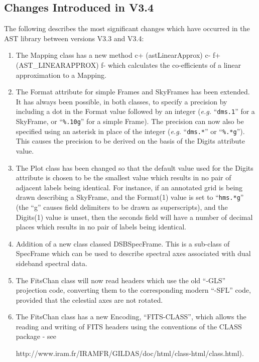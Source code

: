 \documentclass[twoside,11pt]{article}
\newcommand{\htmladdnormallink}[2]{#1}
\begin{document}
\subsection{Changes Introduced in V3.4}

The following describes the most significant changes which have
occurred in the AST library between versions V3.3 and V3.4:

\begin{enumerate}

\item The Mapping class has a new method 
c+
(astLinearApprox)
c-
f+
(AST\_LINEARAPPROX)
f-
which calculates the co-efficients of a linear approximation to a Mapping.

\item The Format attribute for simple Frames and SkyFrames has been extended.
It has always been possible, in both classes, to specify a precision by
including a dot in the Format value followed by an integer (\emph{e.g.}
``\verb+dms.1+'' for a SkyFrame, or ``\verb+%.10g+'' for a simple Frame).
The precision can now also be specified using an asterisk in place of the
integer (\emph{e.g.} ``\verb+dms.*+'' or ``\verb+%.*g+''). This causes the
precision to be derived on the basis of the Digits attribute value.

\item The Plot class has been changed so that the default value used for the
Digits attribute is chosen to be the smallest value which results in no
pair of adjacent labels being identical. For instance, if an annotated
grid is being drawn describing a SkyFrame, and the Format(1) value is set
to ``\verb+hms.*g+'' (the ``g'' causes field delimiters to be drawn as
superscripts), and the Digits(1) value is unset, then the seconds field
will have a number of decimal places which results in no pair of labels
being identical.

\item Addition of a new class classed DSBSpecFrame. This is a 
sub-class of SpecFrame which can be used to describe spectral axes
associated with dual sideband spectral data.

\item The FitsChan class will now read headers which use the old ``-GLS''
projection code, converting them to the corresponding modern ``-SFL'' code,
provided that the celestial axes are not rotated.

\item The FitsChan class has a new Encoding, ``FITS-CLASS'', which allows
the reading and writing of FITS headers using the conventions of the CLASS 
package - see 
\htmladdnormallink{
http://www.iram.fr/IRAMFR/GILDAS/doc/html/class-html/class.html}{
http://www.iram.fr/IRAMFR/GILDAS/doc/html/class-html/class.html}).

\end{enumerate}
\end{document}
